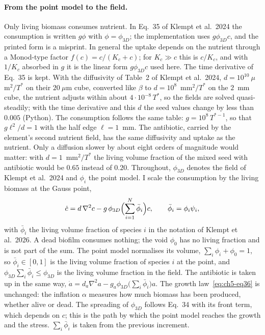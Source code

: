 \paragraph{From the point model to the field.}
Only living biomass consumes nutrient. In Eq.~35 of Klempt et al.\ 2024 the consumption is
written $g\phi$ with $\phi=\phi_{3D}$; the implementation uses $g\phi_{3D}c$, and the printed form is a misprint.
In general the uptake depends on the nutrient through a Monod-type factor $f(c)=c/(K_c+c)$; for
$K_c\gg c$ this is $c/K_c$, and with $1/K_c$ absorbed in $g$ it is the linear form $g\phi_{3D}c$ used here.
The time derivative of Eq.~35 is kept. With the diffusivity of Table~2 of Klempt et al.\ 2024, $d=10^{10}~\mu$m$^2/T^*$
on their $20~\mu$m cube, converted like $\beta$ to $d=10^8$~mm$^2/T^*$ on the $2$~mm cube, the nutrient adjusts within
about $4\cdot10^{-8}\,T^*$, so the fields are solved quasi-steadily; with the time derivative and this $d$ the seed values
change by less than $0.005$ (Python). The consumption follows the same table: $g=10^8\,T^{*-1}$, so that $g\ell^2/d=1$ with the half edge
$\ell=1$~mm. The antibiotic, carried by the element's second nutrient field, has the same diffusivity and uptake as the nutrient. Only a diffusion
slower by about eight orders of magnitude would matter: with $d=1$~mm$^2/T^*$ the living volume fraction of the mixed
seed with antibiotic would be $0.65$ instead of $0.20$.
Throughout, $\phi_{3D}$ denotes the field of Klempt et al.\ 2024 and $\phi_i$ the point model. I scale
the consumption by the living biomass at the Gauss point,
\begin{equation}
\dot c=d\,\nabla^2c-g\,\phi_{3D}\Bigl(\sum_{i=1}^N\bar\phi_i\Bigr)c,\qquad
\bar\phi_i=\phi_i\psi_i,
\label{eq:ch5-consumption}
\end{equation}
with $\bar\phi_i$ the living volume fraction of species $i$ in the notation of Klempt et al.\ 2026.
A dead biofilm consumes nothing; the void $\phi_0$ has no living fraction and is not part of the sum.
The point model normalises its volume, $\sum_i\phi_i+\phi_0=1$, so $\bar\phi_i\in[0,1]$ is
the living volume fraction of species $i$ at the point, and $\phi_{3D}\sum_i\bar\phi_i\le\phi_{3D}$ is
the living volume fraction in the field. The antibiotic is
taken up in the same way, $\dot a=d_a\nabla^2a-g_a\phi_{3D}\bigl(\sum_i\bar\phi_i\bigr)a$. The growth law~\eqref{eq:ch5-eq36} is
unchanged: the inflation $\alpha$ measures how much biomass has been produced, whether alive or
dead. The spreading of $\phi_{3D}$ follows Eq.~34 with its front term, which depends on $c$; this
is the path by which the point model reaches the growth and the stress. $\sum_i\bar\phi_i$ is taken from the
previous increment.

